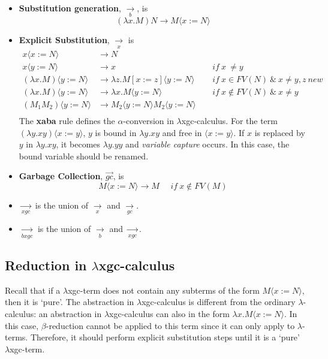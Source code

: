 \begin{itemize}
\item \textbf{Substitution generation}, $\xrightarrow[b]{}$, is 
\begin{equation}
\tag{b}
(\lambda x.M)N \rightarrow M\langle x:=N\rangle
\end{equation}
\item \textbf{Explicit Substitution}, $\xrightarrow[x]{}$ is
\begin{align*} 
\tag{xv} x\langle x:=N\rangle & \rightarrow N &\\
\tag{xvgc} x\langle y:=N\rangle & \rightarrow x  &if\ x\ \neq y \\
\tag{xaba} (\lambda x.M)\langle y:=N\rangle & \rightarrow \lambda z.M[x:=z] \langle y:=N\rangle\ \ \ \ \ \ &if\ x \in FV(N)\ \& \ x\neq y, z\ new\\
\tag{xab} (\lambda x.M)\langle y:=N\rangle & \rightarrow \lambda x.M\langle y:=N\rangle\ \ \ \ \ \ \ \ \ \ \ \ \ \ \ &if\ x\not\in FV(N)\ \& \ x\neq y \\
\tag{xap} (M_1M_2)\langle y:=N\rangle & \rightarrow M_2\langle y:=N\rangle M_2\langle y:=N\rangle&\\
\end{align*}
The \textbf{xaba} rule defines the $\alpha$-conversion in $\lambda$xgc-calculus. For the term $(\lambda y.xy)\langle x:=y\rangle$, $y$ is bound in $\lambda y.xy$ and free in $\langle x:=y\rangle$. If $x$ is replaced by $y$ in $\lambda y.xy$, it becomes $\lambda y.yy$ and \textit{variable capture} occurs. In this case, the bound variable should be renamed.
\item \textbf{Garbage Collection}, $\overrightarrow{gc}$, is
\begin{equation}
\tag{gc}
M\langle x:=N\rangle \rightarrow M\ \ \ \ \ \ if\ x\notin FV(M)
\end{equation}
\item $\xrightarrow[xgc]{}$ is the union of $\xrightarrow[x]{}$ and $\xrightarrow[gc]{}$.
\item $\xrightarrow[bxgc]{}$ is the union of $\xrightarrow[b]{}$ and $\xrightarrow[xgc]{}$.
\end{itemize}

\subsection{Reduction in $\lambda$xgc-calculus}

Recall that if a $\lambda$xgc-term does not contain any subterms of the form $M\langle x := N\rangle$, then it is `pure'. The abstraction in $\lambda$xgc-calculus is different from the ordinary $\lambda$-calculus: an abstraction in $\lambda$xgc-calculus can also in the form $\lambda x.M\langle x := N\rangle$. In this case, $\beta$-reduction cannot be applied to this term since it can only apply to $\lambda$-terms. Therefore, it should perform explicit substitution steps until it is a `pure' $\lambda$xgc-term.

